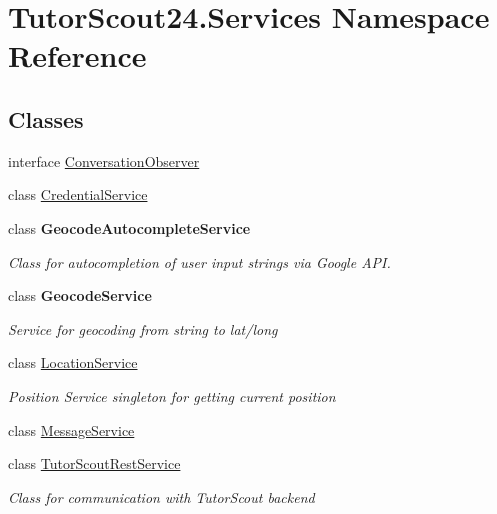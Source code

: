 \hypertarget{namespace_tutor_scout24_1_1_services}{}\section{Tutor\+Scout24.\+Services Namespace Reference}
\label{namespace_tutor_scout24_1_1_services}
\subsection*{Classes}
\begin{DoxyCompactItemize}
\item 
interface \mbox{\hyperlink{interface_tutor_scout24_1_1_services_1_1_conversation_observer}{Conversation\+Observer}}
\item 
class \mbox{\hyperlink{class_tutor_scout24_1_1_services_1_1_credential_service}{Credential\+Service}}
\item 
class {\bfseries Geocode\+Autocomplete\+Service}
\begin{DoxyCompactList}\small\item\em Class for autocompletion of user input strings via Google A\+PI. \end{DoxyCompactList}\item 
class {\bfseries Geocode\+Service}
\begin{DoxyCompactList}\small\item\em Service for geocoding from string to lat/long \end{DoxyCompactList}\item 
class \mbox{\hyperlink{class_tutor_scout24_1_1_services_1_1_location_service}{Location\+Service}}
\begin{DoxyCompactList}\small\item\em Position Service singleton for getting current position \end{DoxyCompactList}\item 
class \mbox{\hyperlink{class_tutor_scout24_1_1_services_1_1_message_service}{Message\+Service}}
\item 
class \mbox{\hyperlink{class_tutor_scout24_1_1_services_1_1_tutor_scout_rest_service}{Tutor\+Scout\+Rest\+Service}}
\begin{DoxyCompactList}\small\item\em Class for communication with Tutor\+Scout backend \end{DoxyCompactList}\end{DoxyCompactItemize}
